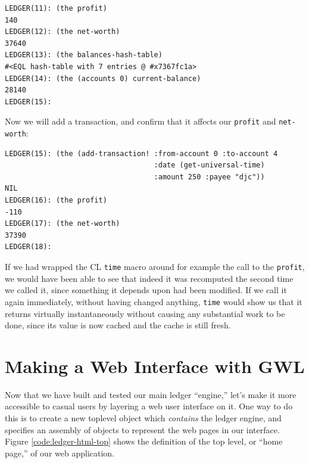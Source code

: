 \documentclass [11pt]{book}
\begin{document}
\begin{verbatim}
LEDGER(11): (the profit)
140
LEDGER(12): (the net-worth)
37640
LEDGER(13): (the balances-hash-table)
#<EQL hash-table with 7 entries @ #x7367fc1a>
LEDGER(14): (the (accounts 0) current-balance)
28140
LEDGER(15):
\end{verbatim}Now we will add a transaction, and confirm that it affects our \texttt{profit} and \texttt{net-worth}:

\begin{verbatim}
LEDGER(15): (the (add-transaction! :from-account 0 :to-account 4 
                                   :date (get-universal-time) 
                                   :amount 250 :payee "djc"))
NIL
LEDGER(16): (the profit)
-110
LEDGER(17): (the net-worth)
37390
LEDGER(18):
\end{verbatim}If we had wrapped the CL \texttt{time} macro around for example the call to the \texttt{profit}, we would have been able to see that indeed it was recomputed the second time
we called it, since something it depends upon had been modified. If we call it again
immediately, without having changed anything, \texttt{time} would show us that it returns virtually instantaneously without causing any
substantial work to be done, since its value is now cached and the cache is still fresh.

\section{Making a Web Interface with GWL}

\label{sec:makingawebinterfacewithgwl}

Now that we have built and tested our main ledger ``engine,'' let's make it more 
accessible to casual users by layering a web user interface on it. One way to do this is
to create a new toplevel object which \emph{contains} the ledger engine, and specifies an assembly of objects to represent the web
pages in our interface. Figure 
\ref{code:ledger-html-top} shows the definition of the top level, or ``home page,'' of our web application.
 
\end{document}
